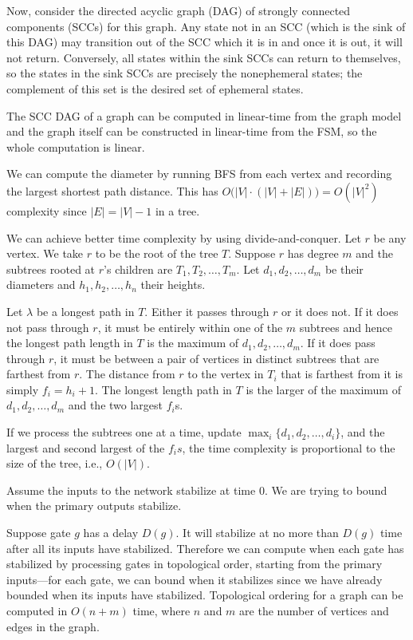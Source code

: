 Now, consider the directed acyclic graph (DAG) of strongly connected components (SCCs) for this graph.  Any state not in an SCC (which is the sink of this DAG)
may transition out of the SCC which it is in and once it is out, it will not return.
Conversely, all states within the sink SCCs can return to themselves, so the states in the
sink SCCs are precisely the nonephemeral states; the complement  of this set is the desired set of ephemeral states.

The SCC DAG of a graph can be computed in linear-time from the
graph model and the graph itself can be constructed in linear-time from the FSM, so the whole computation is linear.

We can compute the diameter by running BFS from each vertex and recording the largest shortest path distance. This has
$O\big(|V|\cdot(|V|+|E|)\big) = O(|V|^2)$ complexity since $|E| = |V|-1$
in a tree.

We can achieve better time complexity by using divide-and-conquer.
Let $r$ be any vertex. We take $r$ to be the root of the tree $T$.
Suppose $r$ has degree $m$ and
the subtrees rooted at $r$'s children are $T_1,T_2,\ldots,T_m$. Let 
$d_1,d_2,\ldots,d_m$ be their diameters and $h_1,h_2,\ldots,h_n$ their heights.

Let $\lambda$ be a longest path in $T$. Either it
passes through $r$ or it does not. 
If it does not pass through $r$, it must be entirely within one of the $m$ subtrees and hence the longest path length in $T$ is the maximum of $d_1,d_2,\ldots,d_m$.
If it does pass through $r$, it must be between a pair of vertices in distinct subtrees
that are farthest from $r$. The distance from $r$ to the vertex in $T_i$ that is farthest
from it is simply $f_i = h_i + 1$.
The longest length path in $T$ is the larger of the maximum of $d_1,d_2,\ldots,d_m$ and the two largest $f_i$s.

If we process the subtrees one at a time,
update $\max_i\{d_1,d_2,\ldots,d_i\}$, and the largest and second
largest of the $f_is$, the time complexity is proportional to the
size of the tree, i.e., $O(|V|)$.


Assume the inputs to the network stabilize at time $0$.
We are trying to bound when the primary outputs stabilize.  

Suppose gate $g$ has a delay $D(g)$.  It will stabilize at
no more  than $D(g)$ time after all its inputs have stabilized.
Therefore we can compute when each gate has stabilized by processing gates
in topological order, starting from the primary inputs---for each gate,
we can bound when it stabilizes since we have already bounded when its
inputs have stabilized.  Topological ordering for a graph
can be computed in $O(n+m)$
time, where $n$ and $m$ are the number of vertices and edges in the graph.

